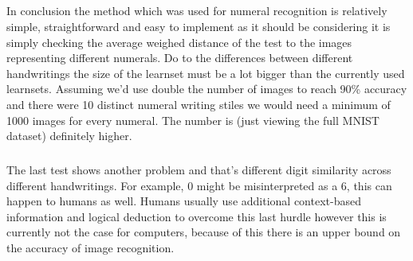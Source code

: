 \documentclass{article}
\begin{document}
	\subparagraph{}
	In conclusion the method which was used for numeral recognition is relatively simple, straightforward and easy to implement as it should be considering it is simply checking the average weighed distance of the test to the images representing different numerals. Do to the differences between different handwritings the size of the learnset must be a lot bigger than the currently used learnsets. Assuming we’d use double the number of images to reach 90\% accuracy and there were 10 distinct numeral writing stiles we would need a minimum of 1000 images for every numeral. The number is (just viewing the full MNIST dataset) definitely higher. 
	\subparagraph{}
	The last test shows another problem and that’s different digit similarity across different handwritings. For example, 0 might be misinterpreted as a 6, this can happen to humans as well. Humans usually use additional context-based information and logical deduction to overcome this last hurdle however this is currently not the case for computers, because of this there is an upper bound on the accuracy of image recognition. 

 

\end{document}
